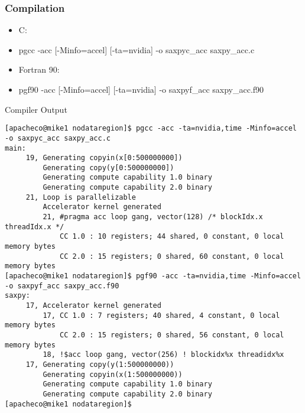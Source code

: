 \documentclass[c,mathserif,compress,xcolor=svgnames]{beamer}
\newenvironment{bblock}[0]
{
\begin{beamerboxesrounded}[upper=uppercol1,lower=lowercol1,shadow=true]}
{\end{beamerboxesrounded}}
\begin{document}
\scriptsize
\begin{frame}[fragile]
  \frametitle{\small Compilation}
  \begin{itemize}
    \item C:
    \item[] pgcc -acc [-Minfo=accel] [-ta=nvidia] -o saxpyc\_acc saxpy\_acc.c
    \item Fortran 90:
    \item[] pgf90 -acc [-Minfo=accel] [-ta=nvidia] -o saxpyf\_acc saxpy\_acc.f90
  \end{itemize}
  \begin{bblock}{Compiler Output}
    {\fontsize{5}{6}\selectfont
      \begin{Verbatim}
[apacheco@mike1 nodataregion]$ pgcc -acc -ta=nvidia,time -Minfo=accel  -o saxpyc_acc saxpy_acc.c
main:
     19, Generating copyin(x[0:500000000])
         Generating copy(y[0:500000000])
         Generating compute capability 1.0 binary
         Generating compute capability 2.0 binary
     21, Loop is parallelizable
         Accelerator kernel generated
         21, #pragma acc loop gang, vector(128) /* blockIdx.x threadIdx.x */
             CC 1.0 : 10 registers; 44 shared, 0 constant, 0 local memory bytes
             CC 2.0 : 15 registers; 0 shared, 60 constant, 0 local memory bytes
[apacheco@mike1 nodataregion]$ pgf90 -acc -ta=nvidia,time -Minfo=accel -o saxpyf_acc saxpy_acc.f90
saxpy:
     17, Accelerator kernel generated
         17, CC 1.0 : 7 registers; 40 shared, 4 constant, 0 local memory bytes
             CC 2.0 : 15 registers; 0 shared, 56 constant, 0 local memory bytes
         18, !$acc loop gang, vector(256) ! blockidx%x threadidx%x
     17, Generating copy(y(1:500000000))
         Generating copyin(x(1:500000000))
         Generating compute capability 1.0 binary
         Generating compute capability 2.0 binary
[apacheco@mike1 nodataregion]$
      \end{Verbatim}
    }
  \end{bblock}
\end{frame}
\end{document}
